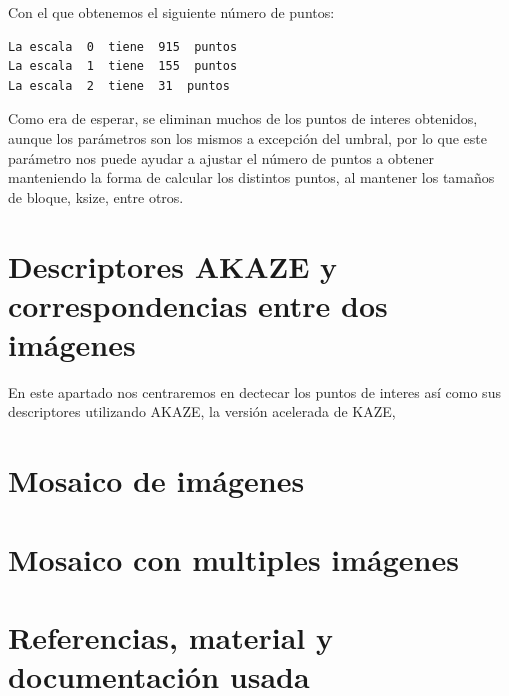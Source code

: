 \documentclass[12pt, spanish]{article}
\begin{document}
Con el que obtenemos el siguiente número de puntos:

\begin{lstlisting}
La escala  0  tiene  915  puntos
La escala  1  tiene  155  puntos
La escala  2  tiene  31  puntos
\end{lstlisting}

Como era de esperar, se eliminan muchos de los puntos de interes obtenidos, aunque los parámetros son los mismos a excepción del umbral, por lo que este parámetro nos puede ayudar a ajustar el número de puntos a obtener manteniendo la forma de calcular los distintos puntos, al mantener los tamaños de bloque, ksize, entre otros.

\section{Descriptores AKAZE y correspondencias entre dos imágenes}

En este apartado nos centraremos en dectecar los puntos de interes así como sus descriptores utilizando AKAZE, la versión acelerada de KAZE,

\section{Mosaico de imágenes}

\section{Mosaico con multiples imágenes}



\newpage

\section{Referencias, material y documentación usada}
\end{document}
